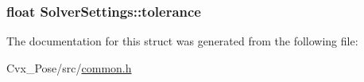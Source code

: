 \hypertarget{structSolverSettings_af42a46e051dd69c1bf2f2aa208a8be8f}{
\subsubsection[{tolerance}]{\setlength{\rightskip}{0pt plus 5cm}float {\bf \-Solver\-Settings\-::tolerance}}}\label{structSolverSettings_af42a46e051dd69c1bf2f2aa208a8be8f}


\-The documentation for this struct was generated from the following file\-:\begin{DoxyCompactItemize}
\item 
\-Cvx\-\_\-\-Pose/src/\hyperlink{common_8h}{common.\-h}\end{DoxyCompactItemize}
